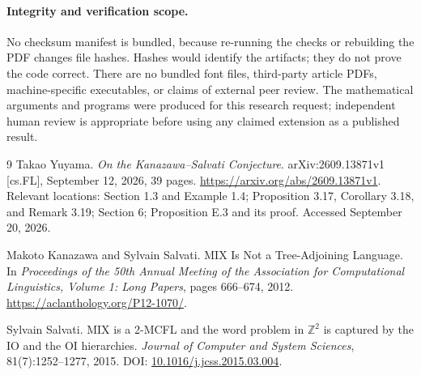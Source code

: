 \documentclass[11pt,letterpaper]{article}
\numberwithin{equation}{section}
\theoremstyle{definition}
\theoremstyle{remark}
\begin{document}
\paragraph{Integrity and verification scope.}
No checksum manifest is bundled, because re-running the checks or
rebuilding the PDF changes file hashes. Hashes would identify the
artifacts; they do not prove the code correct. There are no bundled
font files, third-party article PDFs, machine-specific executables,
or claims of external peer review. The mathematical arguments and
programs were produced for this research request; independent human
review is appropriate before using any claimed extension as a
published result.

\clearpage
{}
{}
\begin{thebibliography}{9}
Takao Yuyama.
\newblock \emph{On the Kanazawa--Salvati Conjecture}.
\newblock arXiv:2609.13871v1 [cs.FL], September 12, 2026, 39 pages.
\newblock \url{https://arxiv.org/abs/2609.13871v1}.
\newblock Relevant locations: Section 1.3 and Example 1.4; Proposition
3.17, Corollary 3.18, and Remark 3.19; Section 6; Proposition E.3 and
its proof. Accessed September 20, 2026.

Makoto Kanazawa and Sylvain Salvati.
\newblock MIX Is Not a Tree-Adjoining Language.
\newblock In \emph{Proceedings of the 50th Annual Meeting of the
Association for Computational Linguistics, Volume 1: Long Papers},
pages 666--674, 2012.
\newblock \url{https://aclanthology.org/P12-1070/}.

Sylvain Salvati.
\newblock MIX is a 2-MCFL and the word problem in \(\mathbb Z^2\) is
captured by the IO and the OI hierarchies.
\newblock \emph{Journal of Computer and System Sciences},
81(7):1252--1277, 2015.
\newblock DOI: \href{https://doi.org/10.1016/j.jcss.2015.03.004}
{10.1016/j.jcss.2015.03.004}.
\end{thebibliography}
\end{document}
